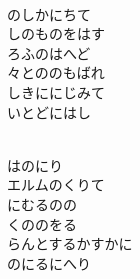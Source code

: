 \documentclass[10pt,b5j]{tarticle} %
\begin{document}
\begin{enumerate}
\begin{minipage}[c]{\blocksize}
    \end{minipage}
    \begin{minipage}[c]{\blocksize}
        
        \vspace{\linespace}
        \item~\\
        のしかにちて\\
        しのものをはす\\
        ろふのはへど\\
        々とののもばれ\\
        しきににじみて\\
        いとどにはし
        
    \end{minipage}
    \begin{minipage}[c]{\blocksize}
        
        \vspace{\linespace}
        \item~\\
        はのにり\\
        エルムのくりて\\
        にむるのの\\
        くののをる\\
        らんとするかすかに\\
        のにるにへり
        
    \end{minipage}
    \begin{minipage}[c]{\blocksize}
        

\end{minipage}
\end{enumerate}
\end{document}
